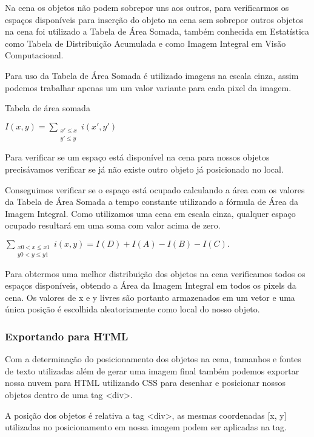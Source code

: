 \documentclass[12pt]{article}
\begin{document}
Na cena os objetos não podem sobrepor uns aos outros, para verificarmos os espaços disponíveis para inserção do objeto na cena sem sobrepor outros objetos na cena foi utilizado a Tabela de Área Somada, também conhecida em Estatística como Tabela de Distribuição Acumulada e como Imagem Integral em Visão Computacional.

Para uso da Tabela de Área Somada é utilizado imagens na escala cinza, assim podemos trabalhar apenas um um valor variante para cada pixel da imagem. 

Tabela de área somada


$I(x,y) = \sum_{\begin{smallmatrix} x' \le x \\ y' \le y\end{smallmatrix}} i(x',y')$

Para verificar se um espaço está disponível na cena para nossos objetos precisávamos verificar se já não existe outro objeto já posicionado no local. 

Conseguimos verificar se o espaço está ocupado calculando a área com os valores da Tabela de Área Somada a tempo constante utilizando a fórmula de Área da Imagem Integral. Como utilizamos uma cena em escala cinza, qualquer espaço ocupado resultará em uma soma com valor acima de zero.  

$\sum_{\begin{smallmatrix} x0 < x \le x1 \\ y0 < y \le y1 \end{smallmatrix}} i(x,y) = I(D) + I(A) - I(B) - I(C).$

Para obtermos uma melhor distribuição dos objetos na cena verificamos todos os espaços disponíveis, obtendo a Área da Imagem Integral em todos os pixels da cena. Os valores de x e y livres são portanto armazenados em um vetor e uma única posição é escolhida aleatoriamente como local do nosso objeto. 


\subsubsection{Exportando para HTML}

Com a determinação do posicionamento dos objetos na cena, tamanhos e fontes de texto utilizadas além de gerar uma imagem final também podemos exportar nossa nuvem para HTML utilizando CSS para desenhar e posicionar nossos objetos dentro de uma tag <div>.

A posição dos objetos é relativa a tag <div>, as mesmas coordenadas [x, y] utilizadas no posicionamento em nossa imagem podem ser aplicadas na tag.
\end{document}
